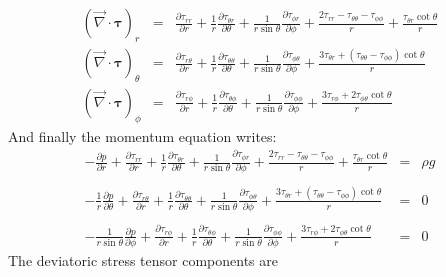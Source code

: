 \begin{eqnarray}
({\vec \nabla}\cdot {\bm \tau})_r 
&=& 
\frac{\partial \tau_{rr}}{\partial r} 
+ \frac{1}{r} \frac{\partial \tau_{\theta r}}{\partial \theta} 
+ \frac{1}{r \sin\theta} \frac{\partial \tau_{\phi r}}{\partial \phi} 
+ \frac{2 \tau_{rr} - \tau_{\theta\theta} -\tau_{\phi\phi}}{r} 
+ \frac{\tau_{\theta r} \cot\theta}{r} 
\nonumber\\
({\vec \nabla}\cdot {\bm \tau})_\theta
&=& 
\frac{\partial \tau_{r\theta}}{\partial r} 
+ \frac{1}{r} \frac{\partial \tau_{\theta \theta}}{\partial \theta} 
+ \frac{1}{r \sin\theta} \frac{\partial \tau_{\phi \theta}}{\partial \phi} 
+ \frac{3 \tau_{\theta r} + (\tau_{\theta\theta}- \tau_{\phi\phi}) \cot\theta}{r} 
 \nonumber\\
({\vec \nabla}\cdot {\bm \tau})_\phi
&=& 
\frac{\partial \tau_{r\phi}}{\partial r} 
+ \frac{1}{r} \frac{\partial \tau_{\theta \phi}}{\partial \theta} 
+ \frac{1}{r \sin\theta} \frac{\partial \tau_{\phi\phi}}{\partial \phi} 
+\frac{3 \tau_{r \phi }+2 \tau_{\phi \theta} \cot\theta}{r} 
\end{eqnarray}
And finally the momentum equation writes: 
\begin{eqnarray}
-\frac{\partial p}{\partial r} 
+\frac{\partial \tau_{rr}}{\partial r} 
+ \frac{1}{r} \frac{\partial \tau_{\theta r}}{\partial \theta} 
+ \frac{1}{r \sin\theta} \frac{\partial \tau_{\phi r}}{\partial \phi} 
+ \frac{2 \tau_{rr} - \tau_{\theta\theta} -\tau_{\phi\phi}}{r} 
+ \frac{\tau_{\theta r} \cot\theta}{r} 
 &=&  \rho g
\nonumber\\
\nonumber\\
- \frac{1}{r}\frac{\partial p}{\partial \theta}  
+\frac{\partial \tau_{r\theta}}{\partial r} 
+ \frac{1}{r} \frac{\partial \tau_{\theta \theta}}{\partial \theta} 
+ \frac{1}{r \sin\theta} \frac{\partial \tau_{\phi \theta}}{\partial \phi} 
+ \frac{3 \tau_{\theta r} + (\tau_{\theta\theta}- \tau_{\phi\phi}) \cot\theta}{r} 
  &=& 0 
\nonumber\\
\nonumber\\
- \frac{1}{r\sin\theta}\frac{\partial p}{\partial \phi} 
+\frac{\partial \tau_{r\phi}}{\partial r} 
+ \frac{1}{r} \frac{\partial \tau_{\theta \phi}}{\partial \theta} 
+ \frac{1}{r \sin\theta} \frac{\partial \tau_{\phi\phi}}{\partial \phi} 
+\frac{3 \tau_{r \phi }+2 \tau_{\phi \theta} \cot\theta}{r} 
&=&0
\label{eq_st1}
\end{eqnarray}
The deviatoric stress tensor components are
